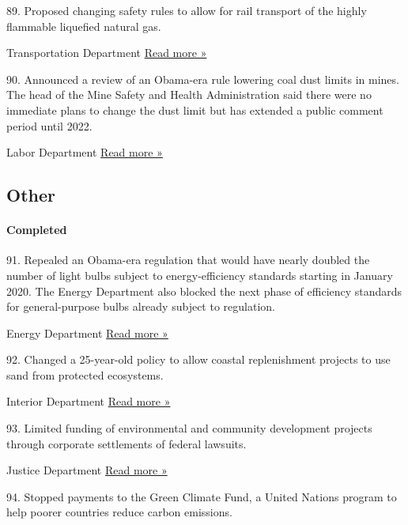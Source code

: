 89. Proposed changing safety rules to allow for rail transport of the
highly flammable liquefied natural gas.

 Transportation Department \textbar{}
\href{https://climate.law.columbia.edu/content/dot-proposes-allowing-lng-rail}{Read
more »}

90. Announced a review of an Obama-era rule lowering coal dust limits in
mines. The head of the Mine Safety and Health Administration said there
were no immediate plans to change the dust limit but has extended a
public comment period until 2022.

 Labor Department \textbar{}
\href{https://www.nytimes3xbfgragh.onion/interactive/2018/02/22/climate/black-lung-resurgence.html}{Read
more »}

\hypertarget{other}{%
\subsection{Other}\label{other}}

\hypertarget{completed-6}{%
\paragraph{Completed}\label{completed-6}}

91. Repealed an Obama-era regulation that would have nearly doubled the
number of light bulbs subject to energy-efficiency standards starting in
January 2020. The Energy Department also blocked the next phase of
efficiency standards for general-purpose bulbs already subject to
regulation.

 Energy Department \textbar{}
\href{https://www.nytimes3xbfgragh.onion/2019/09/04/climate/trump-light-bulb-rollback.html}{Read
more »}

92. Changed a 25-year-old policy to allow coastal replenishment projects
to use sand from protected ecosystems.

 Interior Department \textbar{}
\href{https://www.nytimes3xbfgragh.onion/2019/11/07/climate/trump-beaches-sand-protected-areas.html}{Read
more »}

93. Limited funding of environmental and community development projects
through corporate settlements of federal lawsuits.

 Justice Department \textbar{}
\href{https://www.nytimes3xbfgragh.onion/2017/06/09/us/politics/settlements-sessions-attorney-general.html}{Read
more »}

94. Stopped payments to the Green Climate Fund, a United Nations program
to help poorer countries reduce carbon emissions.

